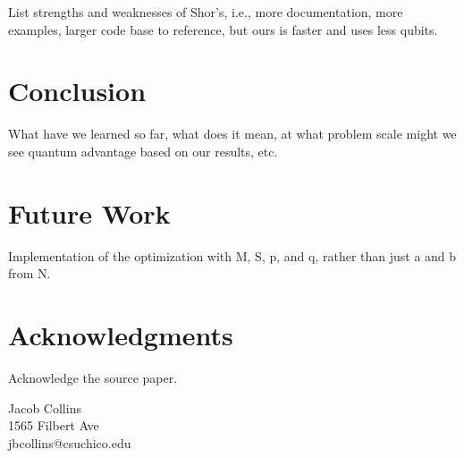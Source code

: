 \documentclass[twocolumn]{cinc}
\begin{document}
  List strengths and weaknesses of Shor's, i.e., more documentation, more
  examples, larger code base to reference, but ours is faster and uses less
  qubits.

\section{Conclusion}

What have we learned so far, what does it mean, at what problem scale might
we see quantum advantage based on our results, etc.

\section{Future Work}
 
Implementation of the optimization with M, S, p, and q, rather than just 
a and b from N.

\section*{Acknowledgments}  
% 
Acknowledge the source paper.





  
  
      


\begin{correspondence}
Jacob Collins\\
1565 Filbert Ave\\
jbcollins@csuchico.edu
\end{correspondence}

\balance
\end{document}
